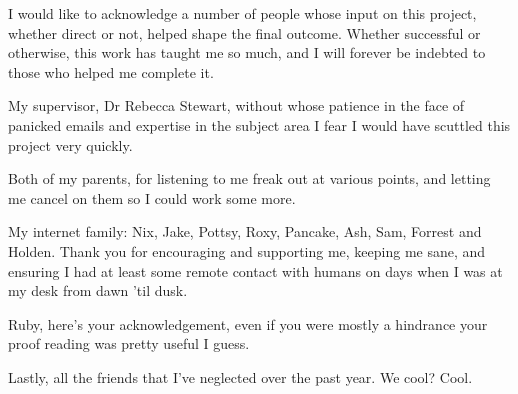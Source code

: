 \noindent
I would like to acknowledge a number of people whose input on this project, whether direct or not, helped shape the final outcome. Whether successful or otherwise, this work has taught me so much, and I will forever be indebted to those who helped me complete it.

\bigskip
\noindent
My supervisor, Dr Rebecca Stewart, without whose patience in the face of panicked emails and expertise in the subject area I fear I would have scuttled this project very quickly. 

\bigskip
\noindent
Both of my parents, for listening to me freak out at various points, and letting me cancel on them so I could work some more.

\bigskip
\noindent
My internet family: Nix, Jake, Pottsy, Roxy, Pancake, Ash, Sam, Forrest and Holden. Thank you for encouraging and supporting me, keeping me sane, and ensuring I had at least some remote contact with humans on days when I was at my desk from dawn 'til dusk.

\bigskip
\noindent
Ruby, here's your acknowledgement, even if you were mostly a hindrance your proof reading was pretty useful I guess. 

\bigskip 
\noindent
Lastly, all the friends that I've neglected over the past year. We cool? Cool.
